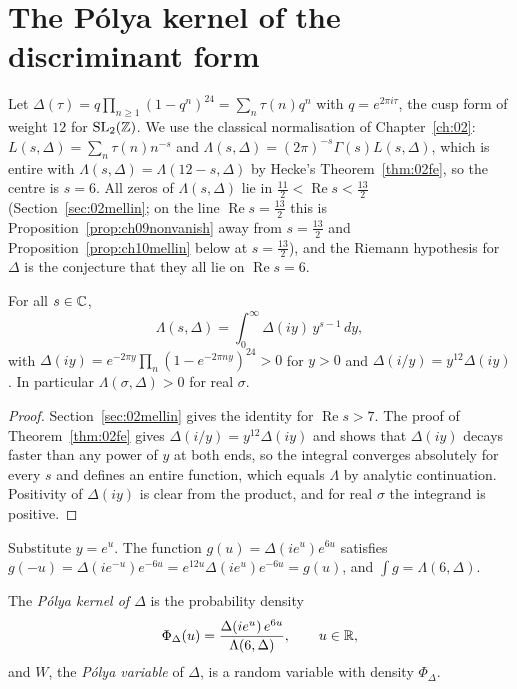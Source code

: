 \section{The P\'olya kernel of the discriminant form}

Let $\Delta(\tau) = q\prod_{n\ge1}(1-q^n)^{24} = \sum_n\tau(n)q^n$ with $q = e^{2\pi i\tau}$, the cusp form of weight $12$ for $\mathrm{SL}_2(\mathbb{Z})$. We use the classical normalisation of Chapter~\ref{ch:02}: $L(s,\Delta) = \sum_n\tau(n)n^{-s}$ and $\Lambda(s,\Delta) = (2\pi)^{-s}\Gamma(s)L(s,\Delta)$, which is entire with $\Lambda(s,\Delta) = \Lambda(12-s,\Delta)$ by Hecke's Theorem~\ref{thm:02fe}, so the centre is $s=6$. All zeros of $\Lambda(s,\Delta)$ lie in $\frac{11}{2}<\operatorname{Re}s<\frac{13}{2}$ (Section~\ref{sec:02mellin}; on the line $\operatorname{Re}s=\frac{13}{2}$ this is Proposition~\ref{prop:ch09nonvanish} away from $s=\frac{13}{2}$ and Proposition~\ref{prop:ch10mellin} below at $s=\frac{13}{2}$), and the Riemann hypothesis for $\Delta$ is the conjecture that they all lie on $\operatorname{Re}s=6$.

\begin{proposition}\label{prop:ch10mellin}
For all $s\in\mathbb{C}$,
\[
\Lambda(s,\Delta) = \int_0^\infty\Delta(iy)\,y^{s-1}\,dy,
\]
with $\Delta(iy) = e^{-2\pi y}\prod_n(1-e^{-2\pi ny})^{24}>0$ for $y>0$ and $\Delta(i/y) = y^{12}\Delta(iy)$. In particular $\Lambda(\sigma,\Delta)>0$ for real $\sigma$.
\end{proposition}

\begin{proof}
Section~\ref{sec:02mellin} gives the identity for $\operatorname{Re}s>7$. The proof of Theorem~\ref{thm:02fe} gives $\Delta(i/y) = y^{12}\Delta(iy)$ and shows that $\Delta(iy)$ decays faster than any power of $y$ at both ends, so the integral converges absolutely for every $s$ and defines an entire function, which equals $\Lambda$ by analytic continuation. Positivity of $\Delta(iy)$ is clear from the product, and for real $\sigma$ the integrand is positive.
\end{proof}

Substitute $y = e^u$. The function $g(u) = \Delta(ie^u)e^{6u}$ satisfies $g(-u) = \Delta(ie^{-u})e^{-6u} = e^{12u}\Delta(ie^u)e^{-6u} = g(u)$, and $\int g = \Lambda(6,\Delta)$.

\begin{definition}
The \emph{P\'olya kernel of $\Delta$} is the probability density
\[
\Phi_\Delta(u) = \frac{\Delta(ie^u)\,e^{6u}}{\Lambda(6,\Delta)},\qquad u\in\mathbb{R},
\]
and $W$, the \emph{P\'olya variable} of $\Delta$, is a random variable with density $\Phi_\Delta$.
\end{definition}

